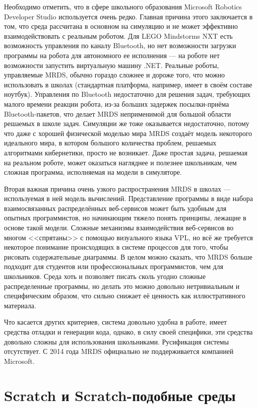 \documentclass[a5paper]{article}
\begin{document}
Необходимо отметить, что в сфере школьного образования Microsoft Robotics Developer Studio используется очень редко. 
Главная причина этого заключается в том, что среда рассчитана в основном на симуляцию и не может эффективно 
взаимодействовать с реальным роботом. Для LEGO Mindstorms NXT есть возможность управления по каналу Bluetooth, 
но нет возможности загрузки программы на робота для автономного ее исполнения --- на роботе нет возможности 
запустить виртуальную машину .NET. Реальные роботы, управляемые MRDS, обычно гораздо сложнее и дороже того, 
что можно использовать в школах (стандартная платформа, например, имеет в своём составе ноутбук). Управления 
по Bluetooth недостаточно для решения задач, требующих малого времени реакции робота, из-за больших задержек 
посылки-приёма Bluetooth-пакетов, что делает MRDS неприменимой для большой области решаемых в школе задач. Симуляции 
же тоже оказывается недостаточно, потому что даже с хорошей физической моделью мира MRDS создаёт модель некоторого 
идеального мира, в котором большого количества проблем, решаемых алгоритмами кибернетики, просто не возникает. 
Даже простая задача, решаемая на реальном роботе, может оказаться нагляднее и полезнее школьникам, чем сложная 
программа, исполняемая на модели в симуляторе.

Вторая важная причина очень узкого распространения MRDS в школах --- используемая в ней модель вычислений. 
Представление программы в виде набора взаимосвязанных распределённых веб-сервисов может быть удобным для 
опытных программистов, но начинающим тяжело понять принципы, лежащие в основе такой модели. Сложные механизмы 
взаимодействия веб-сервисов во многом <<спрятаны>> с помощью визуального языка VPL, но всё же требуется некоторое 
понимание происходящих в системе процессов для того, чтобы рисовать содержательные диаграммы. В целом можно сказать, 
что MRDS больше подходит для студентов или профессиональных программистов, чем для школьников. Среда хоть и 
позволяет писать сколь угодно сложные распределенные программы, но делать это можно довольно нетривиальным и 
специфическим образом, что сильно снижает её ценность как иллюстративного материала.

Что касается других критериев, система довольно удобна в работе, имеет средства отладки и генерации кода, однако, 
в силу своей специфики, эти средства довольно сложны для использования школьниками. Русификация системы отсутствует. 
С 2014 года MRDS официально не поддерживается компанией Microsoft.

\section{Scratch и Scratch-подобные среды}
\end{document}
